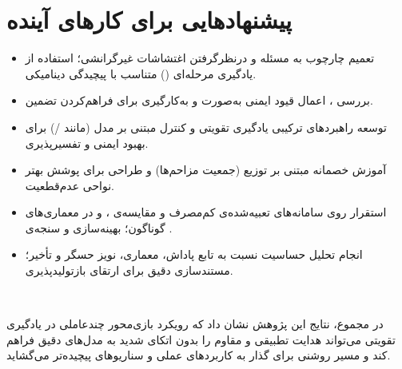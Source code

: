 
\section{پیشنهادهایی برای کارهای آینده}
\begin{itemize}
	\item تعمیم چارچوب به مسئله  و درنظرگرفتن اغتشاشات غیرگرانشی؛ استفاده از یادگیری مرحله‌ای () متناسب با پیچیدگی دینامیکی.
	\item بررسی ، اعمال قیود ایمنی به‌صورت  و به‌کارگیری 
	 برای فراهم‌کردن تضمین.
	\item توسعه راهبردهای ترکیبی یادگیری تقویتی و کنترل مبتنی بر مدل (مانند /) برای بهبود ایمنی و تفسیرپذیری.
	\item آموزش خصمانه مبتنی بر توزیع (جمعیت مزاحم‌ها) و طراحی  برای پوشش بهتر نواحی عدم‌قطعیت.
	\item استقرار روی سامانه‌های تعبیه‌شده‌ی کم‌مصرف و مقایسه‌ی ،  و  در معماری‌های گوناگون؛ بهینه‌سازی  و سنجه‌ی .
	\item انجام تحلیل حساسیت نسبت به تابع پاداش، معماری، نویز حسگر و تأخیر؛ مستندسازی دقیق برای ارتقای بازتولیدپذیری.
\end{itemize}
       

\vspace{0.5em}
در مجموع، نتایج این پژوهش نشان داد که رویکرد بازی‌محور چندعاملی در یادگیری تقویتی می‌تواند هدایت تطبیقی و مقاوم را بدون اتکای شدید به مدل‌های دقیق فراهم کند و مسیر روشنی برای گذار به کاربردهای عملی و سناریوهای پیچیده‌تر می‌گشاید.

